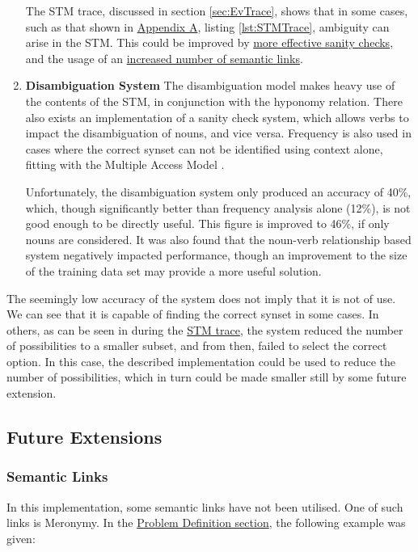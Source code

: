 \documentclass[]{article}
\begin{document}
\begin{enumerate}
		The STM trace, discussed in section \ref{sec:EvTrace}, shows that in some cases, such as that shown in \hyperref[sec:AppA]{Appendix A}, listing \ref{lst:STMTrace}, ambiguity can arise in the STM. This could be improved by \hyperref[sec:FutureSemantic]{more effective sanity checks}, and the usage of an \hyperref[sec:FutureSemantic]{increased number of semantic links}.
	
	\item \textbf{Disambiguation System} \newline
		The disambiguation model makes heavy use of the contents of the STM, in conjunction with the hyponomy relation. There also exists an implementation of a sanity check system, which allows verbs to impact the disambiguation of nouns, and vice versa. Frequency is also used in cases where the correct synset can not be identified using context alone, fitting with the Multiple Access Model \cite{PsychologyOfLanguage}. 
		
		Unfortunately, the disambiguation system only produced an accuracy of 40\%, which, though significantly better than frequency analysis alone (12\%), is not good enough to be directly useful. This figure is improved to 46\%, if only nouns are considered. It was also found that the noun-verb relationship based system negatively impacted performance, though an improvement to the size of the training data set may provide a more useful solution.
	

\end{enumerate}

The seemingly low accuracy of the system does not imply that it is not of use. We can see that it is capable of finding the correct synset in some cases. In others, as can be seen in during the \hyperref[sec:STMTrace]{STM trace}, the system reduced the number of possibilities to a smaller subset, and from then, failed to select the correct option. In this case, the described implementation could be used to reduce the number of possibilities, which in turn could be made smaller still by some future extension.


\subsection{Future Extensions}
\label{sec:ConcFuture}

\subsubsection{Semantic Links}
\label{sec:FutureSemantic}
In this implementation, some semantic links have not been utilised. One of such links is Meronymy. In the \hyperref[sec:ProbDef]{Problem Definition section}, the following example was given:
\end{document}
